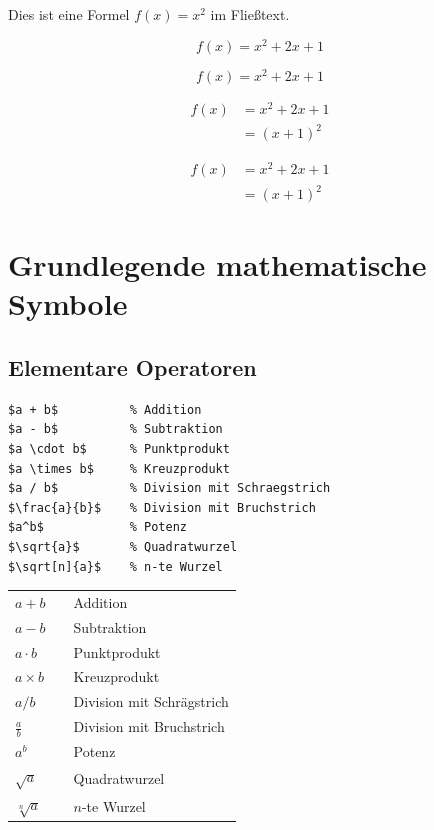 \documentclass[12pt,a4paper]{article}
\begin{document}
\begin{ausgabe}
Dies ist eine Formel $f(x) = x^2$ im Fließtext.

\begin{equation*}
  f(x) = x^2 + 2x + 1
\end{equation*}

\begin{equation}
  f(x) = x^2 + 2x + 1
\end{equation}

\begin{align}
  f(x) &= x^2 + 2x + 1 \\
  &= (x+1)^2
\end{align}

\begin{align*}
  f(x) &= x^2 + 2x + 1 \\
  &= (x+1)^2
\end{align*}
\end{ausgabe}



\section{Grundlegende mathematische Symbole}



\subsection{Elementare Operatoren}

\begin{lstlisting}[style=latex]
$a + b$          % Addition
$a - b$          % Subtraktion
$a \cdot b$      % Punktprodukt
$a \times b$     % Kreuzprodukt
$a / b$          % Division mit Schraegstrich
$\frac{a}{b}$    % Division mit Bruchstrich
$a^b$            % Potenz
$\sqrt{a}$       % Quadratwurzel
$\sqrt[n]{a}$    % n-te Wurzel
\end{lstlisting}

\begin{ausgabe}
\begin{tabular}{l c l}
	$a + b$ & & Addition\\
	$a - b$ & & Subtraktion\\
	$a \cdot b$ & & Punktprodukt\\
	$a \times b$ & & Kreuzprodukt\\
	$a / b$ & & Division mit Schrägstrich\\
	$\frac{a}{b}$ & & Division mit Bruchstrich\\
	$a^b$ & & Potenz\\
	$\sqrt{a}$ & & Quadratwurzel\\
	$\sqrt[n]{a}$ & & $n$-te Wurzel
\end{tabular}
\end{ausgabe}
\end{document}

